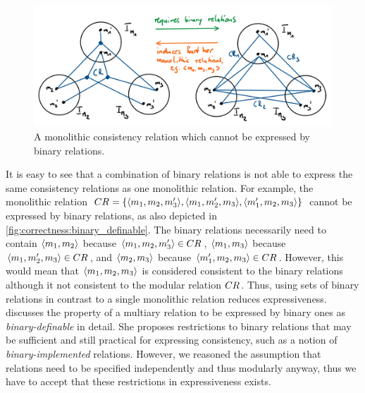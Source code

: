 \begin{figure}
    \centering
    \includegraphics[width=\textwidth]{figures/correctness/notion/binary_definable.png}
    \caption[Monolithic consistency relation that cannot be modularized]{A monolithic consistency relation which cannot be expressed by binary relations.}
    \label{fig:correctness:binary_definable}
\end{figure}

It is easy to see that a combination of binary relations is not able to express the same consistency relations as one monolithic relation.
For example, the monolithic relation $CR_{} = \{ \langle m_{1}, m_{2}, m_{3}' \rangle, \langle m_{1}, m_{2}', m_{3} \rangle, \langle m_{1}', m_{2}, m_{3} \rangle \}$ cannot be expressed by binary relations, as also depicted in \autoref{fig:correctness:binary_definable}.
The binary relations necessarily need to contain $\langle m_{1}, m_{2} \rangle$ because $\langle m_{1}, m_{2}, m_{3}' \rangle \in CR_{}$, $\langle m_{1}, m_{3} \rangle$ because $\langle m_{1}, m_{2}', m_{3} \rangle \in CR_{}$, and $\langle m_{2}, m_{3} \rangle$ because $\langle m_{1}', m_{2}, m_{3} \rangle \in CR_{}$. However, this would mean that $\langle m_{1}, m_{2}, m_{3} \rangle$ is considered consistent to the binary relations although it not consistent to the modular relation $CR_{}$.
Thus, using sets of binary relations in contrast to a single monolithic relation reduces expressiveness.
\textcite{stevens2020BidirectionalTransformationLarge-SoSym} discusses the property of a multiary relation to be expressed by binary ones as \emph{binary-definable} in detail.
She proposes restrictions to binary relations that may be sufficient and still practical for expressing consistency, such as a notion of \emph{binary-implemented} relations.
However, we reasoned the assumption that relations need to be specified independently and thus modularly anyway, thus we have to accept that these restrictions in expressiveness exists.

